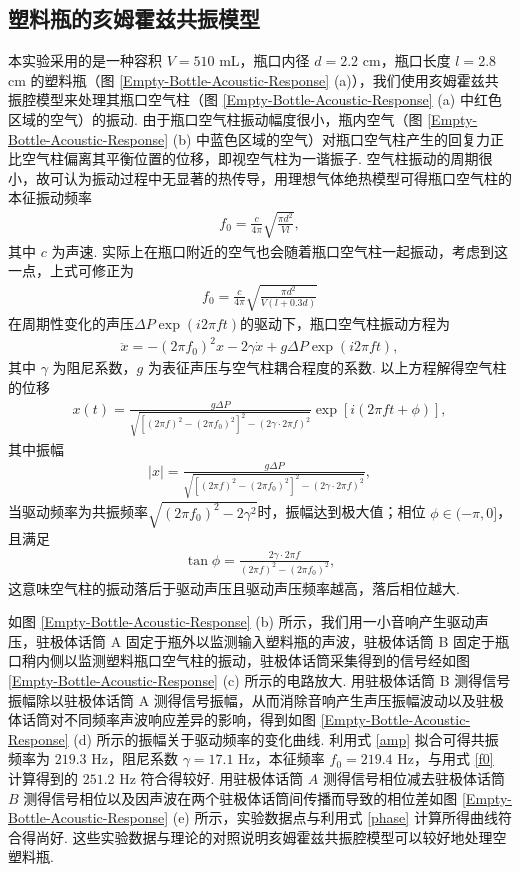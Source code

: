 \documentclass[a4paper, 10pt]{article}
\providecommand{\abs}[1]{\left\lvert#1\right\rvert} %
\begin{document}
\subsection{塑料瓶的亥姆霍兹共振模型}
本实验采用的是一种容积 $V=510$ mL，瓶口内径 $d=2.2$ cm，瓶口长度 $l=2.8$ cm 的塑料瓶（图 \ref{Empty-Bottle-Acoustic-Response} (a)），我们使用亥姆霍兹共振腔模型来处理其瓶口空气柱（图 \ref{Empty-Bottle-Acoustic-Response} (a) 中红色区域的空气）的振动. 由于瓶口空气柱振动幅度很小，瓶内空气（图 \ref{Empty-Bottle-Acoustic-Response} (b) 中蓝色区域的空气）对瓶口空气柱产生的回复力正比空气柱偏离其平衡位置的位移，即视空气柱为一谐振子. 空气柱振动的周期很小，故可认为振动过程中无显著的热传导，用理想气体绝热模型可得瓶口空气柱的本征振动频率
\begin{align}
    f_0=\frac{c}{4\pi}\sqrt{\frac{\pi d^2}{Vl}},
\end{align}
其中 $c$ 为声速. 实际上在瓶口附近的空气也会随着瓶口空气柱一起振动，考虑到这一点，上式可修正为\cite{fonema.se}
\begin{align}
    \label{f0}
    f_0=\frac{c}{4\pi}\sqrt{\frac{\pi d^2}{V(l+0.3d)}}
\end{align}
在周期性变化的声压$\Delta P\exp(i2\pi ft)$的驱动下，瓶口空气柱振动方程为
\begin{align}
    \ddot{x}=-(2\pi f_0)^2x-2\gamma\dot{x}+g\Delta P\exp(i2\pi ft),
\end{align}
其中 $\gamma$ 为阻尼系数，$g$ 为表征声压与空气柱耦合程度的系数. 以上方程解得空气柱的位移
\begin{align}
    x(t)=\frac{g\Delta P}{\sqrt{[(2\pi f)^2-(2\pi f_0)^2]^2-(2\gamma\cdot 2\pi f)^2}}\exp[i(2\pi ft+\phi)],
\end{align}
其中振幅
\begin{align}
    \label{amp}
    \abs{x}=\frac{g\Delta P}{\sqrt{[(2\pi f)^2-(2\pi f_0)^2]^2-(2\gamma\cdot 2\pi f)^2}},
\end{align}
当驱动频率为共振频率$\sqrt{(2\pi f_0)^2-2\gamma^2}$时，振幅达到极大值；相位 $\phi\in(-\pi,0]$，且满足
\begin{align}
    \label{phase}
    \tan\phi=\frac{2\gamma\cdot 2\pi f}{(2\pi f)^2-(2\pi f_0)^2},
\end{align}
这意味空气柱的振动落后于驱动声压且驱动声压频率越高，落后相位越大.

如图 \ref{Empty-Bottle-Acoustic-Response} (b) 所示，我们用一小音响产生驱动声压，驻极体话筒 A 固定于瓶外以监测输入塑料瓶的声波，驻极体话筒 B 固定于瓶口稍内侧以监测塑料瓶口空气柱的振动，驻极体话筒采集得到的信号经如图 \ref{Empty-Bottle-Acoustic-Response} (c) 所示的电路放大. 用驻极体话筒 B 测得信号振幅除以驻极体话筒 A 测得信号振幅，从而消除音响产生声压振幅波动以及驻极体话筒对不同频率声波响应差异的影响，得到如图 \ref{Empty-Bottle-Acoustic-Response} (d) 所示的振幅关于驱动频率的变化曲线. 利用式 \eqref{amp} 拟合可得共振频率为 $219.3$ Hz，阻尼系数 $\gamma=17.1$ Hz，本征频率 $f_0=219.4$ Hz，与用式 \eqref{f0} 计算得到的 $251.2$ Hz 符合得较好. 用驻极体话筒 $A$ 测得信号相位减去驻极体话筒 $B$ 测得信号相位以及因声波在两个驻极体话筒间传播而导致的相位差如图 \ref{Empty-Bottle-Acoustic-Response} (e) 所示，实验数据点与利用式 \eqref{phase} 计算所得曲线符合得尚好. 这些实验数据与理论的对照说明亥姆霍兹共振腔模型可以较好地处理空塑料瓶.
\end{document}
